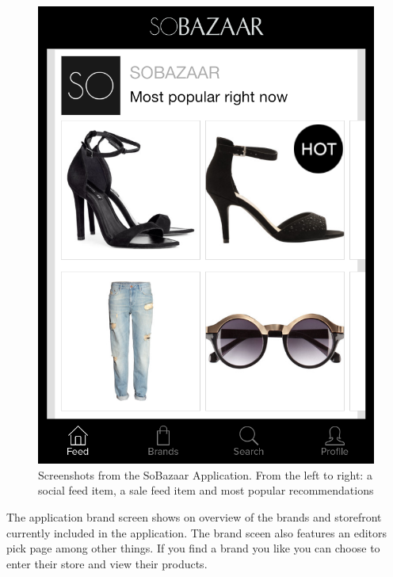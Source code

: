 \begin{figure}[H]
\begin{minipage}{.30\linewidth}
				\includegraphics[height=1.5\linewidth]{image/SoBazaarmostpop.png}
		\end{minipage}
		\caption[SoBazaar newsfeed screenshots - version 0.5.1]{Screenshots from the SoBazaar Application. From the left to right: a social feed item, a sale feed item and most popular recommendations}
		\label{figure:SoBazaarfeed}
	\end{figure}

	The application brand screen shows on overview of the brands and storefront currently included in the application. The brand sceen also features an editors pick page among other things. If you find a brand you like you can choose to enter their store and view their products.	

